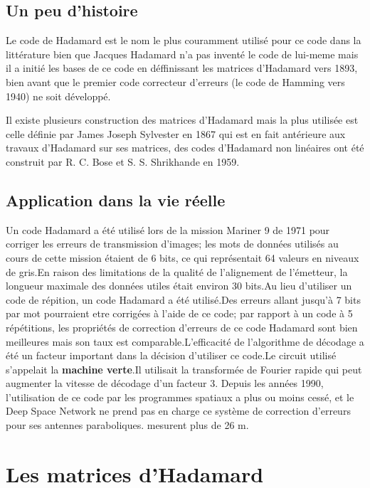 \documentclass{article}
\begin{document}
\subsection{Un peu d'histoire}

Le code de Hadamard est le nom le plus couramment utilisé pour ce code dans
la littérature bien que Jacques Hadamard n'a pas inventé le code de 
lui-meme mais il a initié les bases de ce code en déffinissant les matrices
d'Hadamard vers 1893, bien avant que le premier code correcteur d'erreurs
(le code de Hamming vers 1940) ne soit développé.

Il existe plusieurs construction des matrices d'Hadamard mais la plus 
utilisée est celle définie par James Joseph Sylvester en 1867 qui est en 
fait antérieure aux travaux d'Hadamard sur ses matrices, des codes 
d'Hadamard non linéaires ont été construit par R. C. Bose et S. S. 
Shrikhande en 1959.

\subsection{Application dans la vie réelle}

Un code Hadamard a été utilisé lors de la mission Mariner 9 de 1971 pour
corriger les erreurs de transmission d'images; les mots de données 
utilisés au cours de cette mission étaient de 6 bits, ce qui représentait 
64 valeurs en niveaux de gris.En raison des limitations de la qualité de 
l'alignement de l'émetteur, la longueur maximale des données utiles était 
environ 30 bits.Au lieu d'utiliser un code de répition, un code Hadamard
a été utilisé.Des erreurs allant jusqu'à 7 bits par mot pourraient etre 
corrigées à l'aide de ce code; par rapport à un code à 5 répétitions, les
propriétés de correction d'erreurs de ce code Hadamard sont bien meilleures
mais son taux est comparable.L’efficacité de l’algorithme de décodage a été
un facteur important dans la décision d’utiliser ce code.Le circuit 
utilisé s'appelait la \textbf{machine verte}.Il utilisait la transformée de
Fourier rapide qui peut augmenter la vitesse de décodage d'un facteur 3.
Depuis les années 1990, l'utilisation de ce code par les programmes 
spatiaux a plus ou moins cessé, et le Deep Space Network ne prend pas en 
charge ce système de correction d'erreurs pour ses antennes paraboliques.
mesurent plus de 26 m.

\section{Les matrices d'Hadamard}
\end{document}
